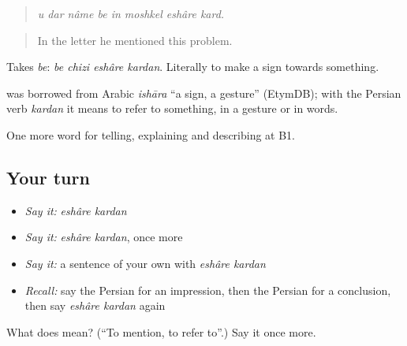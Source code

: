 \begin{quote}
\emph{u dar nâme be in moshkel eshâre kard.}
\end{quote}

\begin{quote}
In the letter he mentioned this problem.
\end{quote}

Takes \emph{be}: \emph{be chizi eshâre kardan}. Literally to make a sign towards something.

\begin{cousinweb}
\textbf{} was borrowed from Arabic \emph{ishāra} \textquotedblleft{}a sign, a gesture\textquotedblright{} (EtymDB); with the Persian verb \emph{kardan} it means to refer to something, in a gesture or in words.
\end{cousinweb}

\begin{grammarlens}[title={What you've built}]
One more word for telling, explaining and describing at B1.
\end{grammarlens}

\subsection*{Your turn}
\begin{itemize}
\raggedright
  \item \emph{Say it:} \emph{eshâre kardan}
  \item \emph{Say it:} \emph{eshâre kardan}, once more
  \item \emph{Say it:} a sentence of your own with \emph{eshâre kardan}
  \item \emph{Recall:} say the Persian for an impression, then the Persian for a conclusion, then say \emph{eshâre kardan} again
\end{itemize}

\begin{tcolorbox}[breakable,colback=teal!4,colframe=teal!35!black,title={Before you move on}]
What does   mean? (\textquotedblleft{}To mention, to refer to\textquotedblright{}.) Say it once more.
\end{tcolorbox}
